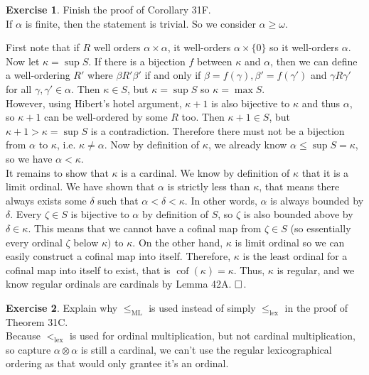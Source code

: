 \documentclass{article}
\theoremstyle{definition}
\newtheorem{exercise}{Exercise}[section]
\newcommand{\so}{\text{\textbf{Solution: }}}
\newcommand{\es}{$\hfill \square$}
\begin{document}
    \begin{exercise}
        Finish the proof of Corollary 31F.\vspace{1em}\\
        \so If $\alpha$ is finite, then the statement is trivial. So we consider $\alpha \geq \omega$. 
        
        First note that if $R$ well orders $\alpha \times \alpha$, it well-orders $\alpha \times \{0\}$ so it well-orders $\alpha$.\\
        Now let $\kappa = \sup S$. If there is a bijection $f$ between $\kappa$ and $\alpha$, then we can define a well-ordering $R'$ where $\beta R' \beta'$ if and only if $\beta = f(\gamma), \beta' = f(\gamma')$ and $\gamma R \gamma'$ for all $\gamma, \gamma' \in \alpha$. Then $\kappa \in S$, but $\kappa = \sup S$ so $\kappa = \max S$. \\
        However, using Hibert's hotel argument, $\kappa + 1$ is also bijective to $\kappa$ and thus $\alpha$, so $\kappa + 1$ can be well-ordered by some $R$ too. Then $\kappa + 1 \in S$, but $\kappa + 1 > \kappa = \sup S$ is a contradiction. Therefore there must not be a bijection from $\alpha$ to $\kappa$, i.e. $\kappa \neq \alpha$. Now by definition of $\kappa$, we already know $\alpha \leq \sup S = \kappa$, so we have $\alpha < \kappa$.\vspace{1em}\\
        It remains to show that $\kappa$ is a cardinal. We know by definition of $\kappa$ that it is a limit ordinal. We have shown that $\alpha$ is strictly less than $\kappa$, that means there always exists some $\delta$ such that $\alpha < \delta < \kappa$. In other words, $\alpha$ is always bounded by $\delta$. Every $\zeta \in S$ is bijective to $\alpha$ by definition of $S$, so $\zeta$ is also bounded above by $\delta \in \kappa$. This means that we cannot have a cofinal map from $\zeta \in S$ (so essentially every ordinal $\zeta$ below $\kappa)$ to $\kappa$. On the other hand, $\kappa$ is limit ordinal so we can easily construct a cofinal map into itself. Therefore, $\kappa$ is the least ordinal for a cofinal map into itself to exist, that is $\operatorname{cof}(\kappa) = \kappa$. Thus, $\kappa$ is regular, and we know regular ordinals are cardinals by Lemma 42A. \es.
    \end{exercise}
    \begin{exercise}
        Explain why $\leq_{\text{ML}}$ is used instead of simply $\leq_{\text{lex}}$ in the proof of Theorem 31C.\\
        \so Because $<_{\text{lex}}$ is used for ordinal multiplication, but not cardinal multiplication, so capture $\alpha \otimes \alpha$ is still a cardinal, we can't use the regular lexicographical ordering as that would only grantee it's an ordinal.
    \end{exercise}
\end{document}
